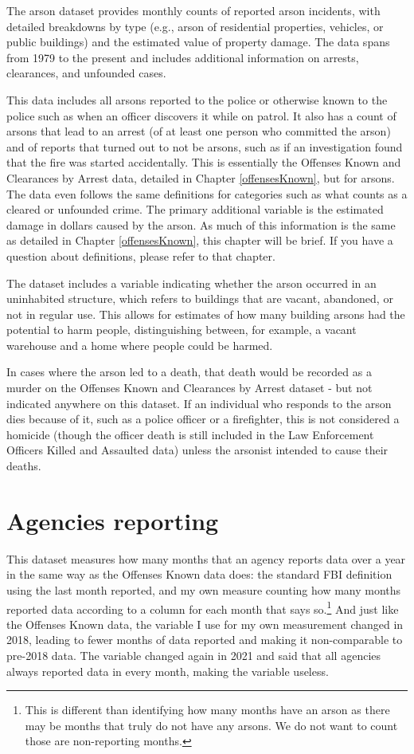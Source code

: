 \documentclass[
]{krantz}
\begin{document}
The arson dataset provides monthly counts of reported arson
incidents, with detailed breakdowns by type (e.g., arson of
residential properties, vehicles, or public buildings) and
the estimated value of property damage. The data spans from
1979 to the present and includes additional information on
arrests, clearances, and unfounded cases.

This data includes all arsons reported to the police or
otherwise known to the police such as when an officer
discovers it while on patrol. It also has a count of arsons
that lead to an arrest (of at least one person who committed
the arson) and of reports that turned out to not be arsons,
such as if an investigation found that the fire was started
accidentally. This is essentially the Offenses Known and
Clearances by Arrest data, detailed in Chapter
\ref{offensesKnown}, but for arsons. The data even follows
the same definitions for categories such as what counts as a
cleared or unfounded crime. The primary additional variable
is the estimated damage in dollars caused by the arson. As
much of this information is the same as detailed in Chapter
\ref{offensesKnown}, this chapter will be brief. If you have
a question about definitions, please refer to that chapter.

The dataset includes a variable indicating whether the arson
occurred in an uninhabited structure, which refers to
buildings that are vacant, abandoned, or not in regular use.
This allows for estimates of how many building arsons had
the potential to harm people, distinguishing between, for
example, a vacant warehouse and a home where people could be
harmed.

In cases where the arson led to a death, that death would be
recorded as a murder on the Offenses Known and Clearances by
Arrest dataset - but not indicated anywhere on this dataset.
If an individual who responds to the arson dies because of
it, such as a police officer or a firefighter, this is not
considered a homicide (though the officer death is still
included in the Law Enforcement Officers Killed and
Assaulted data) unless the arsonist intended to cause their
deaths.

\section{Agencies reporting}\label{agencies-reporting-4}

This dataset measures how many months that an agency reports
data over a year in the same way as the Offenses Known data
does: the standard FBI definition using the last month
reported, and my own measure counting how many months
reported data according to a column for each month that says
so.\footnote{This is different than identifying how many
  months have an arson as there may be months that truly do
  not have any arsons. We do not want to count those are
  non-reporting months.} And just like the Offenses Known
data, the variable I use for my own measurement changed in
2018, leading to fewer months of data reported and making it
non-comparable to pre-2018 data. The variable changed again
in 2021 and said that all agencies always reported data in
every month, making the variable useless.
\end{document}
